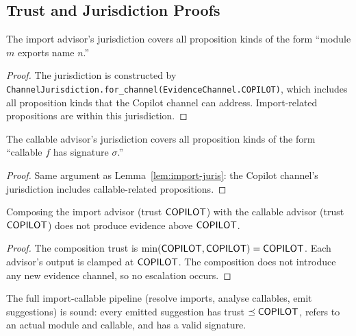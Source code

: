 \documentclass[11pt]{article}
\begin{document}
\subsection{Trust and Jurisdiction Proofs}
\label{app:trust-juris}

\begin{lemma}
\label{lem:import-juris}
The import advisor's jurisdiction covers all proposition kinds
of the form ``module $m$ exports name $n$.''
\end{lemma}

\begin{proof}
The jurisdiction is constructed by
\texttt{ChannelJurisdiction.for\_channel(EvidenceChannel.COPILOT)},
which includes all proposition kinds that the Copilot channel
can address.  Import-related propositions are within this
jurisdiction.
\end{proof}

\begin{lemma}
\label{lem:callable-juris}
The callable advisor's jurisdiction covers all proposition kinds
of the form ``callable $f$ has signature $\sigma$.''
\end{lemma}

\begin{proof}
Same argument as Lemma~\ref{lem:import-juris}: the Copilot
channel's jurisdiction includes callable-related propositions.
\end{proof}

\begin{lemma}
\label{lem:comp-no-escal}
Composing the import advisor (trust $\mathsf{COPILOT}$) with the
callable advisor (trust $\mathsf{COPILOT}$) does not produce evidence
above $\mathsf{COPILOT}$.
\end{lemma}

\begin{proof}
The composition trust is $\min(\mathsf{COPILOT}, \mathsf{COPILOT}) = \mathsf{COPILOT}$.
Each advisor's output is clamped at $\mathsf{COPILOT}$.  The composition
does not introduce any new evidence channel, so no escalation
occurs.
\end{proof}

\begin{proposition}
\label{prop:pipeline-sound}
The full import-callable pipeline (resolve imports, analyse
callables, emit suggestions) is sound: every emitted suggestion
has trust $\preceq \mathsf{COPILOT}$, refers to an actual module and
callable, and has a valid signature.
\end{proposition}
\end{document}
